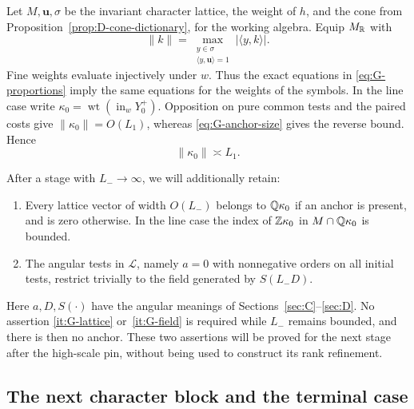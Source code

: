 Let $M,\mathbf u,\sigma$ be the invariant character lattice, the weight of
$h$, and the cone from Proposition~\ref{prop:D-cone-dictionary}, for the
working algebra.  Equip $M_\mathbb R$ with
\begin{equation}\label{eq:G-width}
 \|k\|=\max_{\substack{y\in\sigma\\\langle y,\mathbf u\rangle=1}}
                         |\langle y,k\rangle|.
\end{equation}
Fine weights evaluate injectively under $w$.  Thus the exact equations
in \eqref{eq:G-proportions} imply the same equations for the weights of
the symbols.  In the line case write
$\kappa_0=\operatorname{wt}(\operatorname{in}_wY_0^+)$.  Opposition on pure
common tests and the paired costs give $\|\kappa_0\|=O(L_1)$, whereas
\eqref{eq:G-anchor-size} gives the reverse bound.  Hence
\begin{equation}\label{eq:G-anchor-width}
                         \|\kappa_0\|\asymp L_1.
\end{equation}

After a stage with $L_-\to\infty$, we will additionally retain:
\begin{enumerate}[label=\textup{(H\arabic*)}]
\item\label{it:G-lattice}
Every lattice vector of width $O(L_-)$ belongs to $\mathbb Q\kappa_0$ if an
anchor is present, and is zero otherwise.  In the line case the index of
$\mathbb Z\kappa_0$ in $M\cap\mathbb Q\kappa_0$ is bounded.
\item\label{it:G-field}
The angular tests in $\mathcal L$, namely $a=0$ with nonnegative orders
on all initial tests, restrict trivially to the field generated by
$S(L_-D)$.
\end{enumerate}
Here $a,D,S(\cdot)$ have the angular meanings of
Sections~\ref{sec:C}--\ref{sec:D}.  No assertion
\ref{it:G-lattice} or~\ref{it:G-field} is required while $L_-$ remains
bounded, and there is then no anchor.  These two assertions will be proved
for the next stage after the high-scale pin, without being used to
construct its rank refinement.

\subsection{The next character block and the terminal case}

